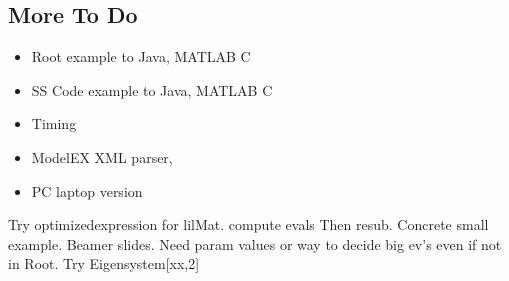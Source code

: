 \documentclass[12pt]{article}
\begin{document}
  \subsection{More To Do}
  \begin{itemize}
  \item Root example  to Java, MATLAB C
  \item SS Code example to Java, MATLAB C
  \item Timing
  \item ModelEX XML parser,
  \item PC laptop version
  \end{itemize}





Try optimizedexpression for lilMat.
compute evals Then resub.
Concrete small example.
Beamer slides.
Need param values or way to decide big ev's even if not in  Root.
Try Eigensystem[xx,2]
\end{document}
